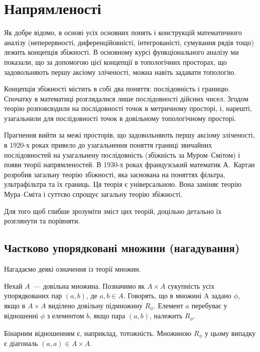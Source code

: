 \chapter{Напрямленості}

Як добре відомо, в основі усіх основних понять і конструкцій математичного аналізу (неперервності, диференційовністі, інтегрованісті, сумування рядів тощо) лежить концепція збіжності. В основному курсі функціонального аналізу ми показали, що за допомогою цієї концепції в топологічних просторах, що задовольняють першу аксіому зліченості, можна навіть задавати топологію. 

Концепція збіжності містить в собі два поняття: послідовність і границю. Спочатку в математиці розглядалися лише послідовності дійсних чисел. Згодом теорію розповсюдили на послідовності точок в метричному просторі, і, нарешті, узагальнили для послідовності точок в довільному топологічному просторі. 

Прагнення вийти за межі просторів, що задовольняють першу аксіому зліченості, в 1920-х роках привело до узагальнення поняття границі звичайних послідовностей на узагальнену послідовність (збіжність за Муром--Смітом) і появи теорії напрямленостей. В 1930-х роках французський математик А.~Картан розробив загальну теорію збіжності, яка заснована на поняттях фільтра, ультрафільтра та їх границь. Ця теорія є універсальною. Вона заміняє теорію Мура--Сміта і суттєво спрощує загальну теорію збіжності. 

Для того щоб глибше зрозуміти зміст цих теорій, доцільно детально їх розглянути та порівняти. 

\section{Частково упорядковані множини (нагадування)}

Нагадаємо деякі означення із теорії множин.

\begin{definition}
    Нехай $A$~--- довільна множина. Позначимо як $A \times A$ сукупність усіх упорядкованих пар $(a, b)$, де $a, b \in A$. Говорять, що в множині A задано  $\phi$, якщо в $A \times A$ виділено довільну підмножину $R_\phi$. Елемент $a$ перебуває у відношенні $\phi$ з елементом $b$, якщо пара $(a, b)$, належить $R_\phi$.
\end{definition}

\begin{example}
    Бінарним відношенням є, наприклад, тотожність. Множиною $R_\phi$ у цьому випадку є діагональ $(a, a) \in A \times A$.
\end{example}

